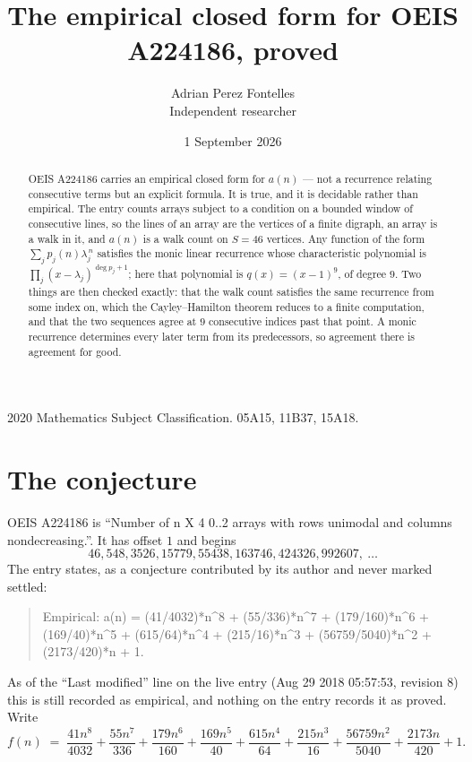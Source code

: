 \documentclass[11pt,a4paper]{article}
\title{The empirical closed form for OEIS A224186, proved}
\author{Adrian Perez Fontelles\\ \small Independent researcher}
\date{1 September 2026}
\theoremstyle{plain}
\theoremstyle{definition}
\begin{document}
\maketitle

\begin{abstract}
OEIS A224186 carries an empirical closed form for $a(n)$ --- not a recurrence relating
consecutive terms but an explicit formula. It is true, and it is decidable rather than
empirical. The entry counts arrays subject to a condition on a bounded window of consecutive lines, so the lines of an array are the
vertices of a finite digraph, an array is a walk in it, and $a(n)$ is a walk count on
$S=46$ vertices. Any function of the form $\sum_j p_j(n)\lambda_j^{\,n}$ satisfies the
monic linear recurrence whose characteristic polynomial is
$\prod_j(x-\lambda_j)^{\deg p_j+1}$; here that polynomial is $q(x)=(x-1)^{9}$, of degree
$9$. Two things are then checked exactly: that the walk count satisfies the same
recurrence from some index on, which the Cayley--Hamilton theorem reduces to a finite
computation, and that the two sequences agree at $9$ consecutive indices past that
point. A monic recurrence determines every later term from its predecessors, so agreement
there is agreement for good.
\end{abstract}

\noindent\small 2020 Mathematics Subject Classification. 05A15, 11B37, 15A18.\normalsize

\section{The conjecture}

OEIS A224186 is ``Number of n X 4 0..2 arrays with rows unimodal and columns nondecreasing.''. It has offset $1$ and begins
\[
46, 548, 3526, 15779, 55438, 163746, 424326, 992607,\ \dots
\]
The entry states, as a conjecture contributed by its author and never marked settled:
\begin{quote}
Empirical: a(n) = (41/4032)*n\^{}8 + (55/336)*n\^{}7 + (179/160)*n\^{}6 + (169/40)*n\^{}5 + (615/64)*n\^{}4 + (215/16)*n\^{}3 + (56759/5040)*n\^{}2 + (2173/420)*n + 1.
\end{quote}
As of the ``Last modified'' line on the live entry (Aug 29 2018 05:57:53, revision 8) this is still
recorded as empirical, and nothing on the entry records it as proved. Write
\[
f(n)\;=\;\frac{41 n^{8}}{4032} + \frac{55 n^{7}}{336} + \frac{179 n^{6}}{160} + \frac{169 n^{5}}{40} + \frac{615 n^{4}}{64} + \frac{215 n^{3}}{16} + \frac{56759 n^{2}}{5040} + \frac{2173 n}{420} + 1.
\]
\end{document}
